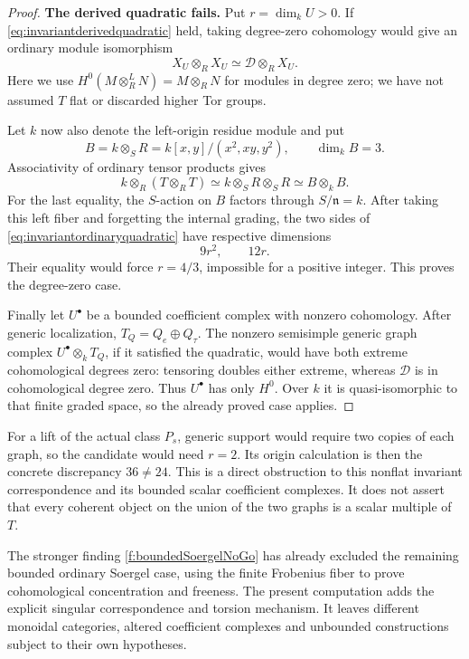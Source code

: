 \begin{proof}
\par\smallskip\noindent\textbf{The derived quadratic fails.}\quad
Put \(r=\dim_kU>0\). If
\eqref{eq:invariantderivedquadratic} held, taking degree-zero
cohomology would give an ordinary module isomorphism
\begin{equation}\label{eq:invariantordinaryquadratic}
 X_U\otimes_R X_U\simeq\mathscr D\otimes_R X_U.
\end{equation}
Here we use
\(H^0(M\otimes_R^L N)=M\otimes_RN\) for modules in degree
zero; we have not assumed \(T\) flat or discarded higher Tor
groups.

Let \(k\) now also denote the left-origin residue module and
put
\[
 B=k\otimes_S R=k[x,y]/(x^2,xy,y^2),\qquad \dim_kB=3.
\]
Associativity of ordinary tensor products gives
\begin{equation}\label{eq:invariantdoublefiber}
 k\otimes_R(T\otimes_R T)
      \simeq k\otimes_S R\otimes_S R
      \simeq B\otimes_k B.
\end{equation}
For the last equality, the \(S\)-action on \(B\) factors
through \(S/\mathfrak n=k\). After taking this left fiber
and forgetting the internal grading, the two sides of
\eqref{eq:invariantordinaryquadratic} have respective
dimensions
\[
                            9r^2,\qquad 12r.
\]
Their equality would force \(r=4/3\), impossible for a
positive integer. This proves the degree-zero case.

Finally let \(U^\bullet\) be a bounded coefficient complex
with nonzero cohomology. After generic localization,
\(T_Q=Q_e\oplus Q_\tau\). The nonzero semisimple generic
graph complex \(U^\bullet\otimes_k T_Q\), if it satisfied
the quadratic, would have both extreme cohomological
degrees zero: tensoring doubles either extreme, whereas
\(\mathscr D\) is in cohomological degree zero.
Thus \(U^\bullet\) has only \(H^0\). Over \(k\) it is
quasi-isomorphic to that finite graded space, so the
already proved case applies.
\end{proof}

For a lift of the actual class \(P_s\), generic support
would require two copies of each graph, so the candidate
would need \(r=2\). Its origin calculation is then the
concrete discrepancy \(36\ne24\).
This is a direct obstruction to this nonflat invariant
correspondence and its bounded scalar coefficient
complexes. It does not assert that every coherent object
on the union of the two graphs is a scalar multiple of
\(T\).

The stronger finding \ref{f:boundedSoergelNoGo} has already
excluded the remaining bounded ordinary Soergel case,
using the finite Frobenius fiber to prove cohomological
concentration and freeness. The present computation adds
the explicit singular correspondence and torsion
mechanism. It leaves different monoidal categories,
altered coefficient complexes and unbounded constructions
subject to their own hypotheses.

